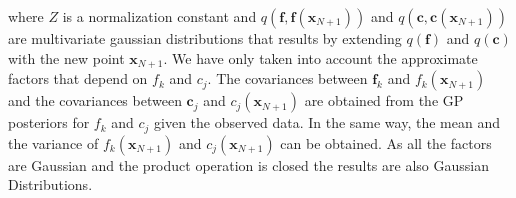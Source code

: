 \documentclass[review,preprint,12pt]{elsarticle}
\begin{document}
where $Z$ is a normalization constant and $q(\boldsymbol{f},\boldsymbol{f}(\boldsymbol{x}_{N+1}))$ and $q(\boldsymbol{c},\boldsymbol{c}(\boldsymbol{x}_{N+1}))$ are multivariate gaussian distributions that results by extending $q(\boldsymbol{f})$ and $q(\boldsymbol{c})$ with the new point $\boldsymbol{x}_{N+1}$. We have only taken into account the approximate factors that depend on $f_k$ and $c_j$. The covariances between $\boldsymbol{f}_k$ and $f_k(\boldsymbol{x}_{N+1})$ and the covariances between $\boldsymbol{c}_j$ and $c_j(\boldsymbol{x}_{N+1})$ are obtained from the GP posteriors for $f_k$ and $c_j$ given the observed data. In the same way, the mean and the variance of $f_k(\boldsymbol{x}_{N+1})$ and $c_j(\boldsymbol{x}_{N+1})$ can be obtained. As all the factors are Gaussian and the product operation is closed the results are also Gaussian Distributions.
\end{document}
